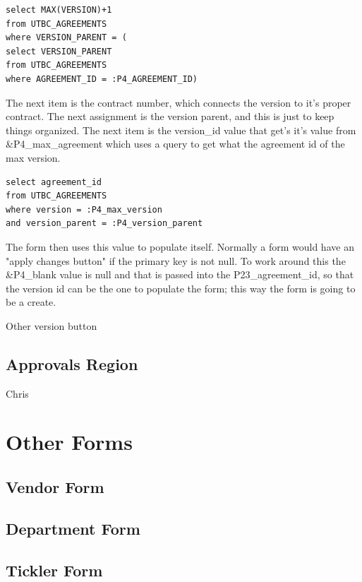 \documentclass{report}
\begin{document}
\begin{lstlisting}[caption=P4\_NEXT\_value query]
select MAX(VERSION)+1 
from UTBC_AGREEMENTS 
where VERSION_PARENT = (
select VERSION_PARENT 
from UTBC_AGREEMENTS 
where AGREEMENT_ID = :P4_AGREEMENT_ID)
\end{lstlisting}

The next item is the contract number, which connects the version to it's proper contract. The next assignment is the version parent, and this is just to keep things organized. The next item is the version\_id value that get's it's value from \&P4\_max\_agreement which uses a query to get what the agreement id of the max version. 

\begin{lstlisting}[caption=P4\_max\_agreement query]
select agreement_id 
from UTBC_AGREEMENTS 
where version = :P4_max_version 
and version_parent = :P4_version_parent
\end{lstlisting}

The form then uses this value to populate itself. Normally a form would have an "apply changes button" if the primary key is not null. To work around this the \&P4\_blank value is null and that is passed into the P23\_agreement\_id, so that the version id can be the one to populate the form; this way the form is going to be a create. 

Other version button

\subsection{Approvals Region}
Chris

\section{Other Forms}

\subsection{Vendor Form}

\subsection{Department Form}

\subsection{Tickler Form}
\end{document}
